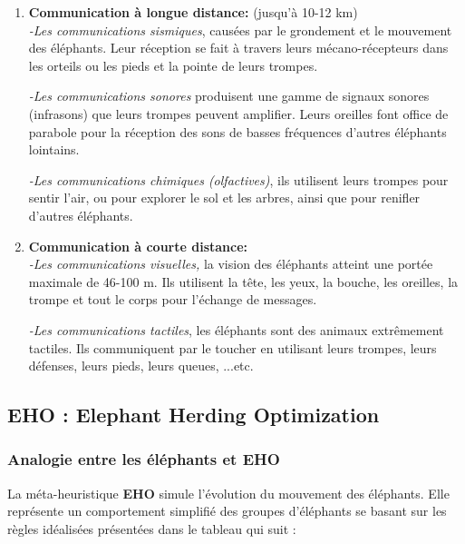 \begin{enumerate}
	\item \textbf{Communication à longue distance:} (jusqu'à 10-12 km)\\
	\textit{-Les communications sismiques}, causées par le grondement et le mouvement des éléphants. Leur réception se fait à travers leurs mécano-récepteurs dans les orteils ou les pieds et la pointe de leurs trompes.\\
	\vspace{-0.2cm}
	
	\textit{-Les communications sonores} produisent une gamme de signaux sonores (infrasons) que leurs trompes peuvent amplifier. Leurs oreilles font office de parabole pour la réception des sons de basses fréquences d'autres éléphants lointains. \\
	\vspace{-0.2cm}
	
	\textit{-Les communications chimiques (olfactives)},  ils utilisent leurs trompes pour sentir l'air, ou pour explorer le sol et les arbres, ainsi que pour renifler d'autres éléphants. 
	
	\item \textbf{Communication à courte distance:}\\
	\textit{-Les communications visuelles,} la vision des éléphants atteint une portée maximale de 46-100 m. Ils utilisent la tête, les yeux, la bouche, les oreilles, la trompe et tout le corps pour l'échange de messages.\\
	\vspace{-0.2cm}
	
	\textit{-Les communications tactiles}, les éléphants sont des animaux extrêmement tactiles. Ils communiquent par le toucher en utilisant leurs trompes, leurs défenses, leurs pieds, leurs queues, ...etc.
	
\end{enumerate} 

\subsection{EHO : Elephant Herding Optimization}
\subsubsection{Analogie entre les éléphants et EHO \cite{EHO2}}

La méta-heuristique \textbf{EHO} simule l'évolution du mouvement des éléphants. Elle représente un comportement simplifié des groupes d'éléphants se basant sur les règles idéalisées présentées dans le tableau qui suit :

